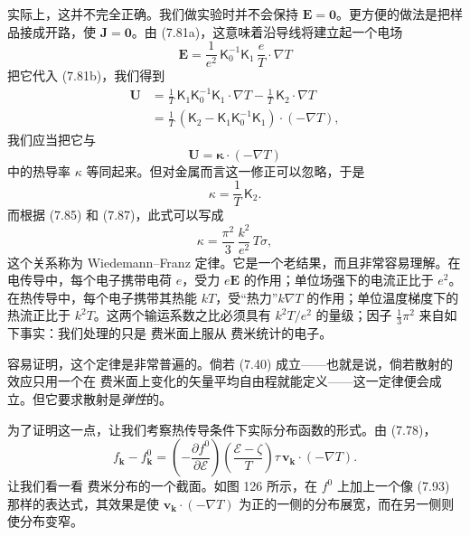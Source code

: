 实际上，这并不完全正确。我们做实验时并不会保持 $\mathbf{E}=\mathbf{0}$。更方便的做法是把样品接成开路，使 $\mathbf{J}=\mathbf{0}$。由 (7.81a)，这意味着沿导线将建立起一个电场
\begin{equation*}
\mathbf{E}=\frac{1}{e^{2}}\,\mathsf{K}_{0}^{-1}\mathsf{K}_{1}\,\frac{e}{T}\cdot\nabla T\tag{7.88}
\end{equation*}
把它代入 (7.81b)，我们得到
\begin{align*}
\mathbf{U}&=\frac{1}{T}\,\mathsf{K}_{1}\mathsf{K}_{0}^{-1}\mathsf{K}_{1}\cdot\nabla T-\frac{1}{T}\,\mathsf{K}_{2}\cdot\nabla T\\
&=\frac{1}{T}\,(\mathsf{K}_{2}-\mathsf{K}_{1}\mathsf{K}_{0}^{-1}\mathsf{K}_{1})\cdot(-\nabla T),\tag{7.89}
\end{align*}
我们应当把它与
\begin{equation*}
\mathbf{U}=\boldsymbol{\kappa}\cdot(-\nabla T)\tag{7.90}
\end{equation*}
中的热导率 $\kappa$ 等同起来。但对金属而言这一修正可以忽略，于是
\begin{equation*}
\kappa=\frac{1}{T}\,\mathsf{K}_{2}.\tag{7.91}
\end{equation*}
而根据 (7.85) 和 (7.87)，此式可以写成
\begin{equation*}
\kappa=\frac{\pi^{2}}{3}\,\frac{k^{2}}{e^{2}}\,T\sigma,\tag{7.92}
\end{equation*}
这个关系称为 Wiedemann--Franz 定律。它是一个老结果，而且非常容易理解。在电传导中，每个电子携带电荷 $e$，受力 $e\mathbf{E}$ 的作用；单位场强下的电流正比于 $e^{2}$。在热传导中，每个电子携带其热能 $kT$，受“热力”$k\nabla T$ 的作用；单位温度梯度下的热流正比于 $k^{2}T$。这两个输运系数之比必须具有 $k^{2}T/e^{2}$ 的量级；因子 $\frac{1}{3}\pi^{2}$ 来自如下事实：我们处理的只是 费米面上服从 费米统计的电子。

容易证明，这个定律是非常普遍的。倘若 (7.40) 成立——也就是说，倘若散射的效应只用一个在 费米面上变化的矢量平均自由程就能定义——这一定律便会成立。但它要求散射是\emph{弹性}的。

为了证明这一点，让我们考察热传导条件下实际分布函数的形式。由 (7.78)，
\begin{equation*}
f_{\mathbf{k}}-f^{0}_{\mathbf{k}}=\left(-\frac{\partial f^{0}}{\partial\mathcal{E}}\right)\left(\frac{\mathcal{E}-\zeta}{T}\right)\tau\,\mathbf{v}_{\mathbf{k}}\cdot(-\nabla T).\tag{7.93}
\end{equation*}
让我们看一看 费米分布的一个截面。如图 126 所示，在 $f^{0}$ 上加上一个像 (7.93) 那样的表达式，其效果是使 $\mathbf{v}_{\mathbf{k}}\cdot(-\nabla T)$ 为正的一侧的分布展宽，而在另一侧则使分布变窄。


